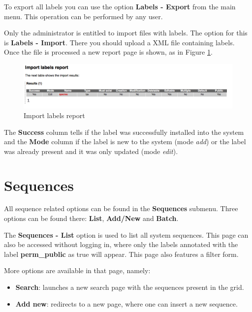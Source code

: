To export all labels you can use the option \textbf{Labels - Export} from the main menu. This
operation can be performed by any user.

Only the administrator is entitled to import files with labels. The option for this is
\textbf{Labels - Import}. There you should upload a XML file containing labels.
Once the file is processed a new report page is shown, as in Figure \ref{fig:import_labels}.

\begin{figure}[H]
  \centering
    \includegraphics[scale=0.4]{import_labels.png}
  \caption{Import labels report}
  \label{fig:import_labels}
\end{figure}

The \textbf{Success} column tells if the label was successfully installed into the system
and the \textbf{Mode} column if the label is new to the system (mode \textit{add}) or the label
was already present and it was only updated (mode \textit{edit}).

\section{Sequences}

All sequence related options can be found in the \textbf{Sequences} submenu.
Three options can be found there: \textbf{List}, \textbf{Add/New} and \textbf{Batch}.

The \textbf{Sequences - List} option is used to list all system sequences. This page can also
be accessed without logging in, where only the labels annotated with the label \textbf{perm\_public}
as true will appear. This page also features a filter form.

More options are available in that page, namely:

\begin{itemize}
  \item \textbf{Search}: launches a new search page with the sequences present in the grid.
  
  \item \textbf{Add new}: redirects to a new page, where one can insert a new sequence.
\end{itemize}

